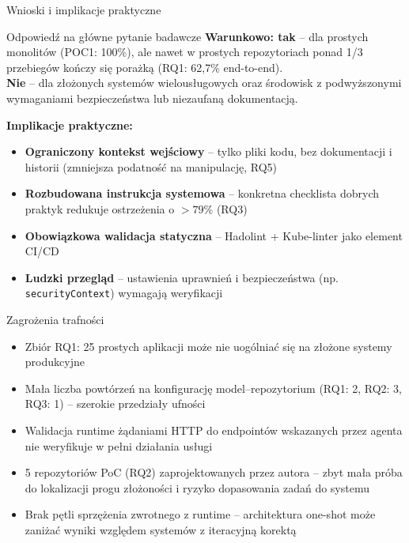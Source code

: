 \documentclass[aspectratio=169]{beamer}
\begin{document}
\begin{frame}{Wnioski i implikacje praktyczne}
    \begin{block}{Odpowiedź na główne pytanie badawcze}
        \textbf{Warunkowo: tak} -- dla prostych monolitów (POC1: 100\%), ale nawet w prostych repozytoriach ponad 1/3 przebiegów kończy się porażką (RQ1: 62,7\% end-to-end).\\
        \textbf{Nie} -- dla złożonych systemów wielousługowych oraz środowisk z podwyższonymi wymaganiami bezpieczeństwa lub niezaufaną dokumentacją.
    \end{block}
    \vspace{0.4em}
    \textbf{Implikacje praktyczne:}
    \begin{itemize}
        \item \textbf{Ograniczony kontekst wejściowy} -- tylko pliki kodu, bez dokumentacji i historii (zmniejsza podatność na manipulację, RQ5)
        \item \textbf{Rozbudowana instrukcja systemowa} -- konkretna checklista dobrych praktyk redukuje ostrzeżenia o $>79\%$ (RQ3)
        \item \textbf{Obowiązkowa walidacja statyczna} -- Hadolint + Kube-linter jako element CI/CD
        \item \textbf{Ludzki przegląd} -- ustawienia uprawnień i bezpieczeństwa (np. \texttt{securityContext}) wymagają weryfikacji
    \end{itemize}
\end{frame}

\begin{frame}{Zagrożenia trafności}
    \begin{itemize}
        \setlength{\itemsep}{0.5em}
        \item Zbiór RQ1: 25 prostych aplikacji może nie uogólniać się na złożone systemy produkcyjne
        \item Mała liczba powtórzeń na konfigurację model--repozytorium (RQ1: 2, RQ2: 3, RQ3: 1) -- szerokie przedziały ufności
        \item Walidacja runtime żądaniami HTTP do endpointów wskazanych przez agenta nie weryfikuje w pełni działania usługi
        \item 5 repozytoriów PoC (RQ2) zaprojektowanych przez autora -- zbyt mała próba do lokalizacji progu złożoności i ryzyko dopasowania zadań do systemu
        \item Brak pętli sprzężenia zwrotnego z runtime -- architektura one-shot może zaniżać wyniki względem systemów z iteracyjną korektą
    \end{itemize}
\end{frame}
\end{document}
